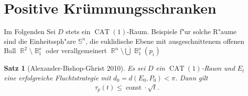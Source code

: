 \documentclass[paper=A4, twoside, chapterprefix=true, bibliography=totoc, headsepline]{scrbook}
\DeclareMathOperator{\B}{\mathbb{B}} %
\DeclareMathOperator{\R}{\mathbb{R}}
\renewcommand{\S}{\mathbb{S}}
\DeclareMathOperator{\const}{const} %
\DeclareMathOperator{\CAT}{CAT}
\theoremstyle{nonumberbreak}
\newtheorem{satz}{Satz}
\theoremstyle{emptybreak}
\theoremstyle{break}
\begin{document}
\section{Positive Kr\"ummungsschranken}

Im Folgenden Sei $D$ stets ein $\CAT(1)$-Raum.
Beispiele f"ur solche R"aume sind die Einheitssph"are $\S^n$, die euklidische Ebene mit ausgeschnittenem offenen Ball $\R^2 \setminus \B_1^o$ oder verallgemeinert $\R^n \setminus \dot\bigcup \B_1^o(p_i)$

\begin{satz}[Alexander-Bishop-Ghrist 2010]
Es sei $D$ ein $\CAT(1)$-Raum und $E_t$ eine erfolgreiche Fluchtstrategie mit $d_0 = d(E_0, P_0) < \pi$.
Dann gilt
\begin{align*}
	\tau_p(t) \le \const \cdot \sqrt{t}.
\end{align*}
\end{satz}
\end{document}
